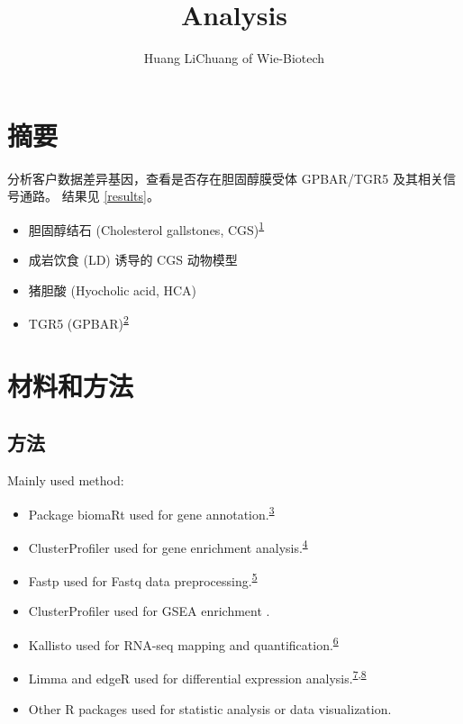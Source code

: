 \documentclass[
]{article}
\title{Analysis}
\author{Huang LiChuang of Wie-Biotech}
\date{}
\providecommand{\tightlist}{%
  \setlength{\itemsep}{0pt}\setlength{\parskip}{0pt}}
\begin{document}
\maketitle

{
\setcounter{tocdepth}{4}
\tableofcontents
}
\listoffigures

\listoftables

\hypertarget{abstract}{%
\section{摘要}\label{abstract}}

分析客户数据差异基因，查看是否存在胆固醇膜受体 GPBAR/TGR5 及其相关信号通路。
结果见 \ref{results}。

\begin{itemize}
\tightlist
\item
  胆固醇结石 (Cholesterol gallstones, CGS)\textsuperscript{\protect\hyperlink{ref-TheScienceOfCole2019}{1}}
\item
  成岩饮食 (LD) 诱导的 CGS 动物模型
\item
  猪胆酸 (Hyocholic acid, HCA)
\item
  TGR5 (GPBAR)\textsuperscript{\protect\hyperlink{ref-Tgr5SignalingHolter2020}{2}}
\end{itemize}

\hypertarget{methods}{%
\section{材料和方法}\label{methods}}

\hypertarget{ux65b9ux6cd5}{%
\subsection{方法}\label{ux65b9ux6cd5}}

Mainly used method:

\begin{itemize}
\tightlist
\item
  Package biomaRt used for gene annotation.\textsuperscript{\protect\hyperlink{ref-MappingIdentifDurinc2009}{3}}
\item
  ClusterProfiler used for gene enrichment analysis.\textsuperscript{\protect\hyperlink{ref-ClusterprofilerWuTi2021}{4}}
\item
  Fastp used for Fastq data preprocessing.\textsuperscript{\protect\hyperlink{ref-UltrafastOnePChen2023}{5}}
\item
  ClusterProfiler used for GSEA enrichment .
\item
  Kallisto used for RNA-seq mapping and quantification.\textsuperscript{\protect\hyperlink{ref-NearOptimalPrBray2016}{6}}
\item
  Limma and edgeR used for differential expression analysis.\textsuperscript{\protect\hyperlink{ref-LimmaPowersDiRitchi2015}{7},\protect\hyperlink{ref-EdgerDifferenChen}{8}}
\item
  Other R packages used for statistic analysis or data visualization.
\end{itemize}
\end{document}
